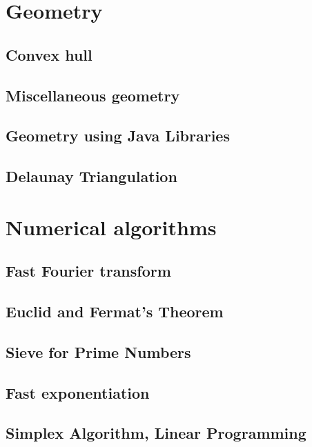 \section{Geometry}
\subsection{Convex hull}
\raggedbottom
\hrulefill
\subsection{Miscellaneous geometry}
\raggedbottom
\hrulefill
\subsection{Geometry using Java Libraries}
\raggedbottom
\hrulefill
\subsection{Delaunay Triangulation}
\raggedbottom
\hrulefill

\section{Numerical algorithms}
\subsection{Fast Fourier transform}
\raggedbottom
\hrulefill
\subsection{Euclid and Fermat's Theorem}
\raggedbottom
\hrulefill
\subsection{Sieve for Prime Numbers}
\raggedbottom
\hrulefill
\subsection{Fast exponentiation}
\raggedbottom
\hrulefill
\subsection{Simplex Algorithm, Linear Programming}
\raggedbottom
\hrulefill
